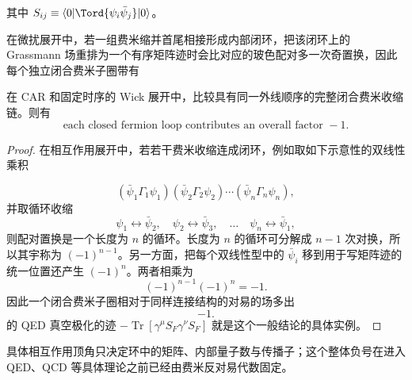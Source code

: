 其中 $S_{ij}\equiv\langle0|\Tord\{\psi_i\bar\psi_j\}|0\rangle$。

在微扰展开中，若一组费米缩并首尾相接形成内部闭环，把该闭环上的 Grassmann 场重排为一个有序矩阵迹时会比对应的玻色配对多一次奇置换，因此每个独立闭合费米子圈带有


\begin{proposition}[闭费米收缩环的符号]
在 CAR 和固定时序的 Wick 展开中，比较具有同一外线顺序的完整闭合费米收缩链。则有
\begin{equation}
 {\text{each closed fermion loop contributes an overall factor }-1.}
\label{eq:generic-closed-fermion-loop-r68}
\end{equation}
\end{proposition}
\begin{proof}
在相互作用展开中，若若干费米收缩连成闭环，例如取如下示意性的双线性乘积

\begin{equation*}
 (\bar\psi_1\Gamma_1\psi_1)
 (\bar\psi_2\Gamma_2\psi_2)\cdots
 (\bar\psi_n\Gamma_n\psi_n),
\end{equation*}
并取循环收缩
\begin{equation*}
 \psi_1\leftrightarrow\bar\psi_2,
 \quad
 \psi_2\leftrightarrow\bar\psi_3,
 \quad\ldots\quad
 \psi_n\leftrightarrow\bar\psi_1,
\end{equation*}
则配对置换是一个长度为 $n$ 的循环。长度为 $n$ 的循环可分解成 $n-1$ 次对换，所以其宇称为 $(-1)^{n-1}$。另一方面，把每个双线性型中的 $\bar\psi_i$ 移到用于写矩阵迹的统一位置还产生 $(-1)^n$。两者相乘为
\begin{equation*}
 (-1)^{n-1}(-1)^n=-1.
\end{equation*}
因此一个闭合费米子圈相对于同样连接结构的对易的场多出
\begin{equation*}
 {-1.}
 \end{equation*}
的 QED 真空极化的迹
$-\operatorname{Tr}[\gamma^\mu S_F\gamma^\nu S_F]$
就是这个一般结论的具体实例。
\end{proof}

具体相互作用顶角只决定环中的矩阵、内部量子数与传播子；这个整体负号在进入 QED、QCD 等具体理论之前已经由费米反对易代数固定。
